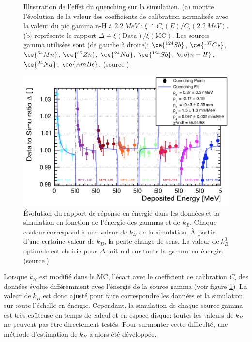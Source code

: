 {\begin{figure}[h!]
\caption[Illustration de l'effet du quenching sur la simulation]{Illustration de l'effet du quenching sur la simulation. (a) montre l'évolution de la valeur des coefficients de calibration normalisés avec la valeur du pic gamma n-H à $\SI{2.2}{MeV}$ : $\xi \doteq C_i(E) / C_i(\SI{2.2}{MeV})$. (b) représente le rapport $\Delta \doteq \xi(\textrm{Data})/\xi(\textrm{MC})$. Les sources gamma utilisées sont (de gauche à droite): $\ce{^{124}Sb}$, $\ce{^{137}Cs}$, $\ce{^{54}Mn}$, $\ce{^{65}Zn}$, $\ce{^{24}Na}$, $\ce{^{124}Sb}$, $\ce{n-H}$, $\ce{^{24}Na}$, $\ce{AmBe}$. (source \cite{docdb929})}
\label{fig:quenching_effect_on_calib}

\end{figure}

\begin{figure}[h!]
  \centering
  \includegraphics[width=0.8\linewidth]{images/kB_evolution.png}
  \caption[Évolution du rapport de réponse en énergie dans les données et la simulation en fonction de l'énergie des gammas et de $k_B$]{Évolution du rapport de réponse en énergie dans les données et la simulation en fonction de l'énergie des gammas et de $k_B$. Chaque couleur correspond à une valeur de $k_B$ de la simulation. À partir d'une certaine valeur de $k_B$, la pente change de sens. La valeur de $k_B^0$ optimale est choisie pour $\Delta$ soit nul sur toute la gamme en énergie. (source \cite{docdb929})}
  \label{fig:kB_evolution.png}
\end{figure}

\clearpage

}

Lorsque $k_B$ est modifié dans le MC, l'écart avec le coefficient de calibration $C_i$ des données évolue différemment avec l'énergie de la source gamma (voir figure \ref{fig:quenching_effect_on_calib}). La valeur de $k_B$ est donc ajusté pour faire correspondre les données et la simulation sur toute l'échelle en énergie. Cependant, la simulation de chaque source gamma est très coûteuse en temps de calcul et en espace disque: toutes les valeurs de $k_B$ ne peuvent pas être directement testés. Pour surmonter cette difficulté, une méthode d'estimation de $k_B$ a alors été développée.

